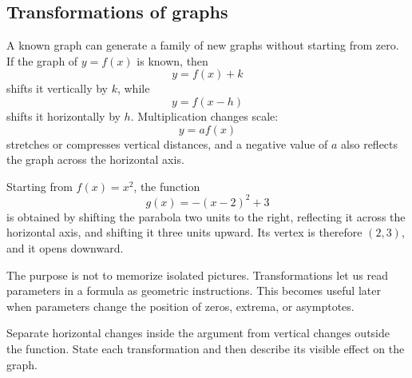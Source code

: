 \subsection{Transformations of graphs}

A known graph can generate a family of new graphs without starting from zero. If the graph of \(y=f(x)\) is known, then
\[
y=f(x)+k
\]
shifts it vertically by \(k\), while
\[
y=f(x-h)
\]
shifts it horizontally by \(h\). Multiplication changes scale:
\[
y=af(x)
\]
stretches or compresses vertical distances, and a negative value of \(a\) also reflects the graph across the horizontal axis.

\begin{examplebox}
Starting from \(f(x)=x^2\), the function
\[
g(x)=-(x-2)^2+3
\]
is obtained by shifting the parabola two units to the right, reflecting it across the horizontal axis, and shifting it three units upward. Its vertex is therefore \((2,3)\), and it opens downward.
\end{examplebox}

\begin{interpretationbox}
The purpose is not to memorize isolated pictures. Transformations let us read parameters in a formula as geometric instructions. This becomes useful later when parameters change the position of zeros, extrema, or asymptotes.
\end{interpretationbox}

\begin{summarybox}
Separate horizontal changes inside the argument from vertical changes outside the function. State each transformation and then describe its visible effect on the graph.
\end{summarybox}
